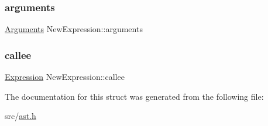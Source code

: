 \subsubsection{\texorpdfstring{arguments}{arguments}}
{\footnotesize\ttfamily \hyperlink{struct_arguments}{Arguments} New\+Expression\+::arguments}

\mbox{\label{struct_new_expression_a4079a15c0800a41cffcf5e408578d2a0}} 
\subsubsection{\texorpdfstring{callee}{callee}}
{\footnotesize\ttfamily \hyperlink{ast_8h_a4cb273a4d960cd13ea17d08f254493e8}{Expression} New\+Expression\+::callee}



The documentation for this struct was generated from the following file\+:\begin{DoxyCompactItemize}
\item 
src/\hyperlink{ast_8h}{ast.\+h}\end{DoxyCompactItemize}

